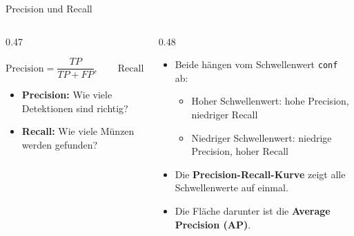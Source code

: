 \begin{frame}{Precision und Recall}
\footnotesize
{}
\begin{columns}
\begin{column}{0.47\textwidth}
\begin{definition}
\[
\text{Precision} = \frac{TP}{TP + FP}, \qquad
\text{Recall} = \frac{TP}{TP + FN}
\]
\end{definition}
\begin{itemize}
  \item \textbf{Precision:} Wie viele Detektionen sind richtig?
  \item \textbf{Recall:} Wie viele Münzen werden gefunden?
\end{itemize}
\end{column}
\begin{column}{0.48\textwidth}
\begin{itemize}
  \item Beide hängen vom Schwellenwert \texttt{conf} ab:
  \begin{itemize}
    \item Hoher Schwellenwert: hohe Precision, niedriger Recall
    \item Niedriger Schwellenwert: niedrige Precision, hoher Recall
  \end{itemize}
  \item Die \textbf{Precision-Recall-Kurve} zeigt alle Schwellenwerte auf einmal.
  \item Die Fläche darunter ist die \textbf{Average Precision (AP)}.
\end{itemize}
\end{column}
\end{columns}
\end{frame}

